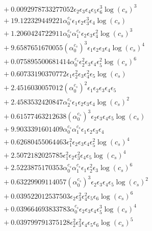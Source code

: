 \documentclass[10pt]{article}
\begin{document}
\begin{align*}
&{}  + 0.0092978733277052 \epsilon_{2} \epsilon_{3} \epsilon_{4} \epsilon_{5} \epsilon_{6}^{3} \log{\left(c_{s} \right)}^{3} \\
&{}  + 19.122329449221 \alpha_{0}^{c_s} \epsilon_{1} \epsilon_{2} \epsilon_{3}^{3} \epsilon_{4} \log{\left(c_{s} \right)} \\
&{}  + 1.2060424722911 \alpha_{0}^{c_s} \alpha_{1}^{c_s} \epsilon_{2} \epsilon_{3} \epsilon_{4}^{2} \log{\left(c_{s} \right)}^{3} \\
&{}  + 9.6587651670055 \left(\alpha_{0}^{c_s}\right)^{3} \epsilon_{1} \epsilon_{2} \epsilon_{3} \epsilon_{4} \log{\left(c_{s} \right)}^{4} \\
&{}  + 0.075895500681414 \alpha_{0}^{c_s} \epsilon_{2}^{2} \epsilon_{3} \epsilon_{4} \epsilon_{5}^{2} \log{\left(c_{s} \right)}^{6} \\
&{}  + 0.60733190370772 \epsilon_{1} \epsilon_{2}^{2} \epsilon_{3} \epsilon_{4}^{2} \epsilon_{5} \log{\left(c_{s} \right)} \\
&{}  + 2.4516030057012 \left(\alpha_{0}^{c_s}\right)^{2} \epsilon_{1} \epsilon_{2} \epsilon_{3} \epsilon_{4} \epsilon_{5} \\
&{}  + 2.4583532420847 \alpha_{2}^{c_s} \epsilon_{1} \epsilon_{2} \epsilon_{3} \epsilon_{4} \log{\left(c_{s} \right)}^{2} \\
&{}  + 0.61577463212638 \left(\alpha_{0}^{c_s}\right)^{3} \epsilon_{2} \epsilon_{3} \epsilon_{4} \epsilon_{5} \log{\left(c_{s} \right)} \\
&{}  + 9.9033391601409 \alpha_{0}^{c_s} \alpha_{1}^{c_s} \epsilon_{1} \epsilon_{2} \epsilon_{3} \epsilon_{4} \\
&{}  + 0.62680455064463 \epsilon_{1}^{2} \epsilon_{2} \epsilon_{3} \epsilon_{4} \epsilon_{5}^{2} \log{\left(c_{s} \right)}^{4} \\
&{}  + 2.5072182025785 \epsilon_{1}^{2} \epsilon_{2} \epsilon_{3}^{2} \epsilon_{4} \epsilon_{5} \log{\left(c_{s} \right)}^{4} \\
&{}  + 2.5223875170353 \alpha_{0}^{c_s} \alpha_{1}^{c_s} \epsilon_{1} \epsilon_{2}^{2} \epsilon_{3} \log{\left(c_{s} \right)}^{6} \\
&{}  + 0.63229909114057 \left(\alpha_{0}^{c_s}\right)^{3} \epsilon_{2} \epsilon_{3} \epsilon_{4} \epsilon_{5} \log{\left(c_{s} \right)}^{2} \\
&{}  + 0.039522012537503 \epsilon_{2} \epsilon_{3}^{2} \epsilon_{4}^{2} \epsilon_{5} \epsilon_{6} \log{\left(c_{s} \right)}^{6} \\
&{}  + 0.039664693833783 \alpha_{0}^{c_s} \epsilon_{2} \epsilon_{3} \epsilon_{4} \epsilon_{5}^{3} \log{\left(c_{s} \right)}^{4} \\
&{}  + 0.039799791375128 \epsilon_{2}^{2} \epsilon_{3}^{2} \epsilon_{4} \epsilon_{5} \epsilon_{6} \log{\left(c_{s} \right)}^{5}
\end{align*}
\end{document}
